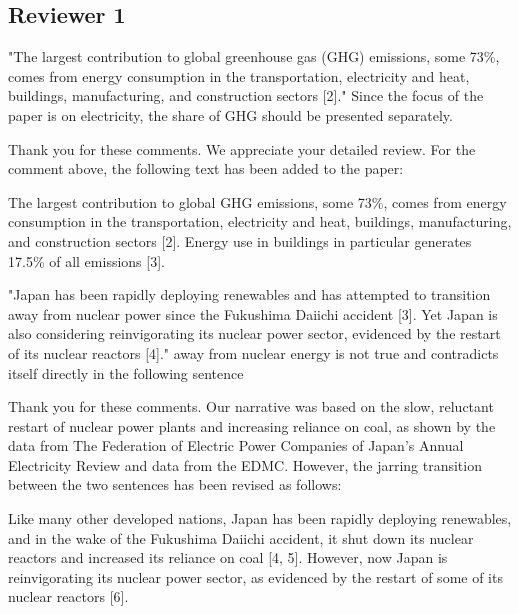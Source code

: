 \documentclass[answers,11pt]{exam}
\begin{document}
\begin{questions}
        \section*{Reviewer 1}

        
         \question "The largest contribution to global greenhouse gas (GHG) emissions, some 73\%, comes from energy consumption in the transportation, electricity and heat, buildings, manufacturing, and construction sectors [2]."
Since the focus of the paper is on electricity, the share of GHG should be presented separately.
        
        \begin{solution}
                Thank you for these comments. We appreciate your detailed review. For the comment above, the following text has been added to the paper:
                
                The largest contribution to global \gls{GHG} emissions, some 73\%, comes from energy consumption in the transportation, electricity and heat, buildings, manufacturing, and construction sectors [2]. Energy use in buildings in particular generates 17.5\% of all emissions [3].
        \end{solution}

        
         \question "Japan has been rapidly deploying renewables and has attempted to transition away from nuclear power since the Fukushima Daiichi accident [3]. Yet Japan is also considering reinvigorating its nuclear power sector, evidenced by the restart of its nuclear reactors [4]."
 away from nuclear energy is not true and contradicts itself directly in the following sentence
        
        \begin{solution}
                Thank you for these comments.  Our narrative was based on the slow, reluctant restart of nuclear power plants and increasing reliance on coal, as shown by the data from The Federation of Electric Power Companies of Japan's Annual Electricity Review and data from the EDMC. However, the jarring transition between the two sentences has been revised as follows:
                
                Like many other developed nations, Japan has been rapidly deploying renewables, and in the wake of the Fukushima Daiichi accident, it shut down its nuclear reactors and increased its reliance on coal [4, 5]. However, now Japan is reinvigorating its nuclear power sector, as evidenced by the restart of some of its nuclear reactors [6].
                

\end{solution}
\end{questions}
\end{document}
